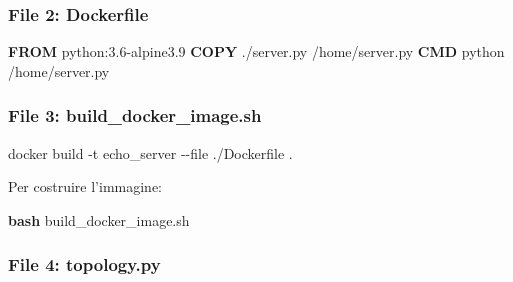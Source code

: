\documentclass[
  italian,
  openany]{book}
\newenvironment{Shaded}{\begin{snugshade}}{\end{snugshade}}
\newcommand{\AttributeTok}[1]{\textcolor[rgb]{0.13,0.29,0.53}{#1}}
\newcommand{\ExtensionTok}[1]{#1}
\newcommand{\FunctionTok}[1]{\textcolor[rgb]{0.13,0.29,0.53}{\textbf{#1}}}
\newcommand{\KeywordTok}[1]{\textcolor[rgb]{0.13,0.29,0.53}{\textbf{#1}}}
\newcommand{\NormalTok}[1]{#1}
\begin{document}
\subsubsection{File 2: Dockerfile}\label{file-2-dockerfile}

\begin{Shaded}
\begin{Highlighting}[]
\KeywordTok{FROM}\NormalTok{ python:3.6{-}alpine3.9}
\KeywordTok{COPY}\NormalTok{ ./server.py /home/server.py}
\KeywordTok{CMD} \ExtensionTok{python}\NormalTok{ /home/server.py}
\end{Highlighting}
\end{Shaded}

\subsubsection{File 3:
build\_docker\_image.sh}\label{file-3-build_docker_image.sh}

\begin{Shaded}
\begin{Highlighting}[]
\ExtensionTok{docker}\NormalTok{ build }\AttributeTok{{-}t}\NormalTok{ echo\_server }\AttributeTok{{-}{-}file}\NormalTok{ ./Dockerfile .}
\end{Highlighting}
\end{Shaded}

Per costruire l'immagine:

\begin{Shaded}
\begin{Highlighting}[]
\FunctionTok{bash}\NormalTok{ build\_docker\_image.sh}
\end{Highlighting}
\end{Shaded}

\subsubsection{File 4: topology.py}\label{file-4-topology.py}
\end{document}
